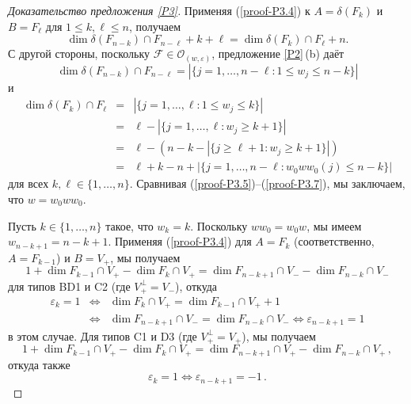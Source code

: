 \documentclass{amsart}
\theoremstyle{definition}
\begin{document}
\begin{proof}[Доказательство предложения \ref{P3}]
Применяя (\ref{proof-P3.4}) к $A=\delta\left( F_k\right)$ и $B=F_\ell$ для $1\leq k,\ell\leq n$, получаем
\begin{equation}
\label{proof-P3.5}
\dim \delta\left( F_{n-k}\right)\cap F_{n-\ell}+k+\ell=\dim \delta \left(F_k\right)\cap F_\ell+n.
\end{equation}
С другой стороны, поскольку $\mathcal{F}\in\mathcal{O}_{(w,\varepsilon)}$, предложение \ref{P2}\,{\rm (b)} даёт
\begin{equation}
\label{proof-P3.6}
\dim \delta\left( F_{n-k}\right)\cap F_{n-\ell}=|\{j=1,\ldots,n-\ell:1\leq w_j\leq n-k\}|
\end{equation}
и
\begin{eqnarray}
\label{proof-P3.7}
\dim\delta \left(F_k\right)\cap F_\ell & = & |\{j=1,\ldots,\ell:1\leq w_j\leq k\}| \\
\nonumber & = & \ell-|\{j=1,\ldots,\ell:w_j\geq k+1\}| \\
\nonumber & = & \ell-(n-k-|\{j\geq \ell+1:w_j\geq k+1\}|) \\
\nonumber & = & \ell+k-n+|\{j=1,\ldots,n-\ell:w_0ww_0(j)\leq n-k\}|
\end{eqnarray}
для всех $k,\ell\in\{1,\ldots,n\}$. Сравнивая (\ref{proof-P3.5})--(\ref{proof-P3.7}), мы заключаем, что $w=w_0ww_0$.

Пусть $k\in\{1,\ldots,n\}$ такое, что $w_k=k$. Поскольку $ww_0=w_0w$, мы имеем $w_{n-k+1}=n-k+1$.
Применяя (\ref{proof-P3.4}) для $A=F_k$ (соответственно, $A=F_{k-1}$) и $B=V_+$, мы получаем
\[1+\dim F_{k-1}\cap V_+-\dim F_k\cap V_+=\dim F_{n-k+1}\cap V_--\dim F_{n-k}\cap V_-\]
для типов BD1 и C2 (где $V_+^\perp=V_-$), откуда
\begin{eqnarray*}
\varepsilon_k=1 & \Leftrightarrow &  \dim F_k\cap V_+=\dim F_{k-1}\cap V_++1 \\
 & \Leftrightarrow &  \dim F_{n-k+1}\cap V_-=\dim F_{n-k}\cap V_-\Leftrightarrow\varepsilon_{n-k+1}=1
\end{eqnarray*}
в этом случае.  Для типов C1 и D3  (где $V_+^\perp=V_+$), мы получаем
\[1+\dim F_{k-1}\cap V_+-\dim F_k\cap V_+=\dim F_{n-k+1}\cap V_+-\dim F_{n-k}\cap V_+\,,\]
откуда также
\[\varepsilon_k=1\Leftrightarrow \varepsilon_{n-k+1}=-1\,.\]


\end{proof}
\end{document}
